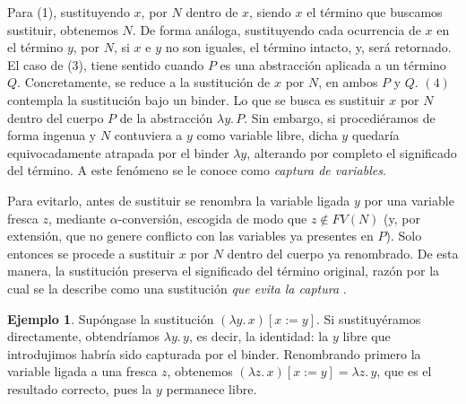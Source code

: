 \documentclass[a4paper,12pt]{report}
\theoremstyle{definition}
\newtheorem{example}{Ejemplo}[chapter]
\theoremstyle{plain}
\theoremstyle{remark}
\begin{document}
Para (1), sustituyendo $x$, por $N$ dentro de $x$, siendo $x$ el término que buscamos sustituir, obtenemos $N$. De forma análoga, sustituyendo cada ocurrencia de $x$ en el término $y$, por $N$, si $x$ e $y$ no son iguales, el término intacto, y, será retornado. El caso de (3), tiene sentido cuando $P$ es una abstracción aplicada a un término $Q$. Concretamente, se reduce a la sustitución de $x$ por $N$, en ambos $P$ y $Q$. $(4)$ contempla la sustitución bajo un binder. Lo que se busca es
sustituir $x$ por $N$ dentro del cuerpo $P$ de la abstracción $\lambda y.\, P$. Sin embargo,
si procediéramos de forma ingenua y $N$ contuviera a $y$ como variable libre, dicha $y$
quedaría equivocadamente atrapada por el binder $\lambda y$, alterando por completo el
significado del término. A este fenómeno se le conoce como \textit{captura de variables}.

Para evitarlo, antes de sustituir se renombra la variable ligada $y$ por una variable fresca
$z$, mediante $\alpha$-conversi\'on, escogida de modo que $z \notin FV(N)$ (y, por extensi\'on,
que no genere conflicto con las variables ya presentes en $P$). Solo entonces se procede a
sustituir $x$ por $N$ dentro del cuerpo ya renombrado. De esta manera, la sustituci\'on
preserva el significado del t\'ermino original, raz\'on por la cual se la describe como una
sustituci\'on \textit{que evita la captura} \citep{pierce2002}.

\begin{example}
  Sup\'ongase la sustituci\'on $(\lambda y.\, x)[x := y]$. Si sustituy\'eramos directamente,
  obtendr\'iamos $\lambda y.\, y$, es decir, la identidad: la $y$ libre que introdujimos
  habr\'ia sido capturada por el binder. Renombrando primero la variable ligada a una
  fresca $z$, obtenemos $(\lambda z.\, x)[x := y] = \lambda z.\, y$, que es el resultado
  correcto, pues la $y$ permanece libre.
\end{example}
\end{document}
